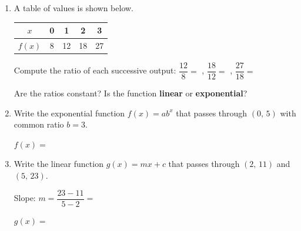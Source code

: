 \documentclass[10pt]{article}
\begin{document}
\namedateperiod

\vspace{0.14in}

\begin{enumerate}[itemsep=16pt]

\item A table of values is shown below.

      \renewcommand{\arraystretch}{1.4}
      \begin{tabular}{|c|c|c|c|c|}
        \hline
        $x$    & 0 & 1  & 2  & 3  \\
        \hline
        $f(x)$ & 8 & 12 & 18 & 27 \\
        \hline
      \end{tabular}

      \vspace{0.08in}
      Compute the ratio of each successive output: $\dfrac{12}{8} = $ ,
      $\dfrac{18}{12} = $ ,
      $\dfrac{27}{18} = $ 

      \vspace{0.06in}
      Are the ratios constant?  \quad
      Is the function \textbf{linear} or \textbf{exponential}? 

\item Write the exponential function $f(x) = ab^x$ that passes through $(0,\,5)$ with
      common ratio $b = 3$.

      \vspace{0.06in}
      $f(x) = $ 

\item Write the linear function $g(x) = mx + c$ that passes through $(2,\,11)$ and $(5,\,23)$.

      \vspace{0.06in}
      Slope: $m = \dfrac{23 - 11}{5 - 2} = $ 

      \vspace{0.06in}
      $g(x) = $ 

\end{enumerate}
\end{document}
